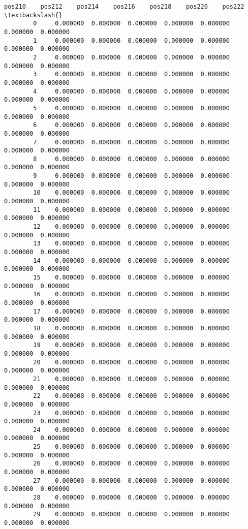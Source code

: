 \documentclass[11pt]{article}
\begin{document}
\begin{Verbatim}[commandchars=\\\{\}]
                pos210    pos212    pos214    pos216    pos218    pos220    pos222  \textbackslash{}
        0     0.000000  0.000000  0.000000  0.000000  0.000000  0.000000  0.000000   
        1     0.000000  0.000000  0.000000  0.000000  0.000000  0.000000  0.000000   
        2     0.000000  0.000000  0.000000  0.000000  0.000000  0.000000  0.000000   
        3     0.000000  0.000000  0.000000  0.000000  0.000000  0.000000  0.000000   
        4     0.000000  0.000000  0.000000  0.000000  0.000000  0.000000  0.000000   
        5     0.000000  0.000000  0.000000  0.000000  0.000000  0.000000  0.000000   
        6     0.000000  0.000000  0.000000  0.000000  0.000000  0.000000  0.000000   
        7     0.000000  0.000000  0.000000  0.000000  0.000000  0.000000  0.000000   
        8     0.000000  0.000000  0.000000  0.000000  0.000000  0.000000  0.000000   
        9     0.000000  0.000000  0.000000  0.000000  0.000000  0.000000  0.000000   
        10    0.000000  0.000000  0.000000  0.000000  0.000000  0.000000  0.000000   
        11    0.000000  0.000000  0.000000  0.000000  0.000000  0.000000  0.000000   
        12    0.000000  0.000000  0.000000  0.000000  0.000000  0.000000  0.000000   
        13    0.000000  0.000000  0.000000  0.000000  0.000000  0.000000  0.000000   
        14    0.000000  0.000000  0.000000  0.000000  0.000000  0.000000  0.000000   
        15    0.000000  0.000000  0.000000  0.000000  0.000000  0.000000  0.000000   
        16    0.000000  0.000000  0.000000  0.000000  0.000000  0.000000  0.000000   
        17    0.000000  0.000000  0.000000  0.000000  0.000000  0.000000  0.000000   
        18    0.000000  0.000000  0.000000  0.000000  0.000000  0.000000  0.000000   
        19    0.000000  0.000000  0.000000  0.000000  0.000000  0.000000  0.000000   
        20    0.000000  0.000000  0.000000  0.000000  0.000000  0.000000  0.000000   
        21    0.000000  0.000000  0.000000  0.000000  0.000000  0.000000  0.000000   
        22    0.000000  0.000000  0.000000  0.000000  0.000000  0.000000  0.000000   
        23    0.000000  0.000000  0.000000  0.000000  0.000000  0.000000  0.000000   
        24    0.000000  0.000000  0.000000  0.000000  0.000000  0.000000  0.000000   
        25    0.000000  0.000000  0.000000  0.000000  0.000000  0.000000  0.000000   
        26    0.000000  0.000000  0.000000  0.000000  0.000000  0.000000  0.000000   
        27    0.000000  0.000000  0.000000  0.000000  0.000000  0.000000  0.000000   
        28    0.000000  0.000000  0.000000  0.000000  0.000000  0.000000  0.000000   
        29    0.000000  0.000000  0.000000  0.000000  0.000000  0.000000  0.000000   

\end{Verbatim}
\end{document}
